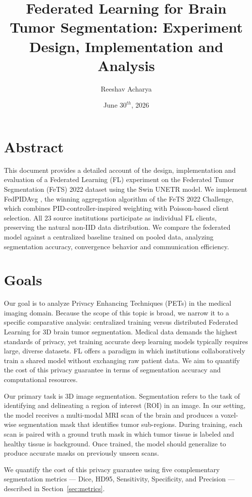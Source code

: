 \documentclass{article}
\title{Federated Learning for Brain Tumor Segmentation: Experiment Design, Implementation and Analysis}
\author{Reeshav Acharya}
\date{June $30^{th}$, 2026}
\begin{document}
\maketitle

\section{Abstract}
This document provides a detailed account of the design, implementation and evaluation of a Federated Learning (FL) experiment on the Federated Tumor Segmentation (FeTS) 2022 dataset using the Swin UNETR model. We implement FedPIDAvg \cite{hatamizadeh_swin_2022_fedpidavg}, the winning aggregation algorithm of the FeTS 2022 Challenge, which combines PID-controller-inspired weighting with Poisson-based client selection. All 23 source institutions participate as individual FL clients, preserving the natural non-IID data distribution. We compare the federated model against a centralized baseline trained on pooled data, analyzing segmentation accuracy, convergence behavior and communication efficiency.

\section{Goals}
Our goal is to analyze Privacy Enhancing Techniques (PETs) in the medical imaging domain. Because the scope of this topic is broad, we narrow it to a specific comparative analysis: centralized training versus distributed Federated Learning for 3D brain tumor segmentation. Medical data demands the highest standards of privacy, yet training accurate deep learning models typically requires large, diverse datasets. FL offers a paradigm in which institutions collaboratively train a shared model without exchanging raw patient data. We aim to quantify the cost of this privacy guarantee in terms of segmentation accuracy and computational resources.

Our primary task is 3D image segmentation. Segmentation refers to the task of identifying and delineating a region of interest (ROI) in an image. In our setting, the model receives a multi-modal MRI scan of the brain and produces a voxel-wise segmentation mask that identifies tumor sub-regions. During training, each scan is paired with a ground truth mask in which tumor tissue is labeled and healthy tissue is background. Once trained, the model should generalize to produce accurate masks on previously unseen scans.

We quantify the cost of this privacy guarantee using five complementary segmentation metrics --- Dice, HD95, Sensitivity, Specificity, and Precision --- described in Section~\ref{sec:metrics}.
\end{document}
